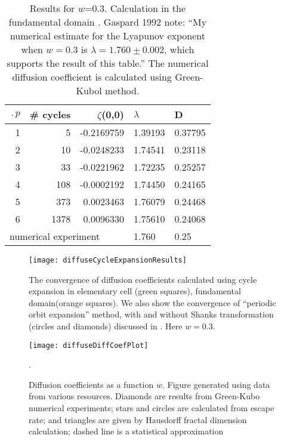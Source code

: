 \begin{table}[htbp]
\centering
\begin{tabular}{|r|r|r|l|l|}
\hline
$\period{p}$ & \# cycles & $\zeta$(0,0) & $\lambda$ & D \\ \hline\hline
1      & 5      & -0.2169759 & 1.39193 & 0.37795 \\
2      & 10     & -0.0248233 & 1.74541 & 0.23118 \\
3      & 33     & -0.0221962 & 1.72235 & 0.25257 \\
4      & 108    & -0.0002192 & 1.74450 & 0.24165 \\
5      & 373    &  0.0023463 & 1.76079 & 0.24468 \\
6      & 1378   &  0.0096330 & 1.75610 & 0.24068 \\ \hline\hline
\multicolumn{3}{|l|}{numerical experiment}
                             & 1.760   & 0.25
\\ \hline
\end{tabular}
\caption{\label{TCELL2}
  Results for $w$=0.3. Calculation in the fundamental domain . Gaspard 
  1992 note: ``My
  numerical estimate for the Lyapunov exponent when $w=0.3$ is
  $\lambda = 1.760 \pm 0.002$, which supports the result of this
  table.'' The numerical diffusion coefficient is calculated using 
  Green-Kubol method. 
}
\end{table}

\begin{figure}[htbp]
  \texttt{[image: diffuseCycleExpansionResults]}
  \caption[]{\label{fig-convergence}
  The convergence of diffusion coefficients  calculated using cycle
  expansion in elementary cell (green squares),  fundamental
  domain(orange squares). We  also show the convergence of ``periodic
  orbit expansion'' method, with and  without Shanks transformation
  (circles and diamonds) discussed in  . Here $w =
  0.3$.
  }
\end{figure}

\begin{figure}
\texttt{[image: diffuseDiffCoefPlot]}
  \caption[]{\label{fig-results} Diffusion coefficients as a function
  $w$.  Figure generated using data from various resources. Diamonds
  are results from  Green-Kubo numerical experiments;
  stars and  circles are calculated from
  escape rate; and triangles are  given by Hausdorff fractal dimension
  calculation; dashed line  is a statistical
  approximation}.
\end{figure}


